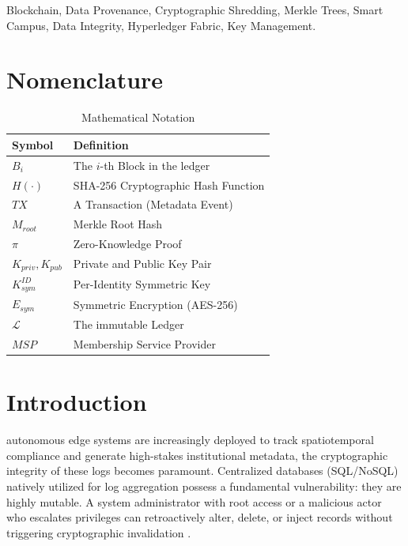\documentclass[conference]{IEEEtran}
\begin{document}
\begin{IEEEkeywords}
Blockchain, Data Provenance, Cryptographic Shredding, Merkle Trees, Smart Campus, Data Integrity, Hyperledger Fabric, Key Management.
\end{IEEEkeywords}

\section*{Nomenclature}
\begin{table}[h]
\centering
\caption{Mathematical Notation}
\begin{tabular}{ll}
\toprule
\textbf{Symbol} & \textbf{Definition} \\
\midrule
$B_i$ & The $i$-th Block in the ledger \\
$H(\cdot)$ & SHA-256 Cryptographic Hash Function \\
$TX$ & A Transaction (Metadata Event) \\
$M_{root}$ & Merkle Root Hash \\
$\pi$ & Zero-Knowledge Proof \\
$K_{priv}, K_{pub}$ & Private and Public Key Pair \\
$K_{sym}^{ID}$ & Per-Identity Symmetric Key \\
$E_{sym}$ & Symmetric Encryption (AES-256) \\
$\mathcal{L}$ & The immutable Ledger \\
$MSP$ & Membership Service Provider \\
\bottomrule
\end{tabular}
\end{table}

\section{Introduction}
 autonomous edge systems are increasingly deployed to track spatiotemporal compliance and generate high-stakes institutional metadata, the cryptographic integrity of these logs becomes paramount. Centralized databases (SQL/NoSQL) natively utilized for log aggregation possess a fundamental vulnerability: they are highly mutable. A system administrator with root access or a malicious actor who escalates privileges can retroactively alter, delete, or inject records without triggering cryptographic invalidation \cite{b10}. 
\end{document}
